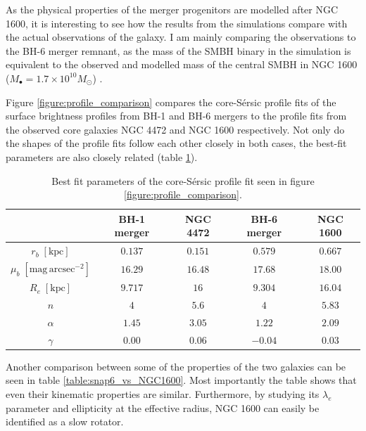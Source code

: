 \documentclass[english, oneside]{HYgradu}
\begin{document}
As the physical properties of the merger progenitors are modelled after NGC 1600, it is interesting to see how the results from the simulations compare with the actual observations of the galaxy. I am mainly comparing the observations to the BH-6 merger remnant, as the mass of the SMBH binary in the simulation is equivalent to the observed and modelled mass of the central SMBH in NGC 1600 ($M_\bullet = 1.7 \times 10^{10} M_\odot$) \citep{Thomas2016}.

Figure \ref{figure:profile_comparison} compares the core-Sérsic profile fits of the surface brightness profiles from BH-1 and BH-6 mergers to the profile fits from the observed core galaxies NGC 4472 and NGC 1600 respectively. Not only do the shapes of the profile fits follow each other closely in both cases, the best-fit parameters are also closely related (table \ref{table:bestfit_parameter_comparison}). 

\begin{table}
	\begin{center}
		\scriptsize
		\begin{tabular}{| c | c c | c c |}
		\hline
		 & BH-1 merger & NGC 4472 & BH-6 merger & NGC 1600 \\
		\hline
		$r_b \; \mathrm{[kpc]}$ & $0.137$ & $0.151$ & $0.579$ & $0.667$ \\
		$\mu_b \; \mathrm{[mag \, arcsec^{-2}]}$ & $16.29$ & $16.48$ & $17.68$ & $18.00$ \\
		$R_e \; \mathrm{[kpc]}$ & $9.717$ & $16$ & $9.304$ & $16.04$ \\
		$n$ & $4$ & $5.6$ & $4$ & $5.83$ \\
		$\alpha$ & $1.45$ & $3.05$ & $1.22$ & $2.09$ \\
		$\gamma$ & $0.00$ & $0.06$ & $-0.04$ & $0.03$ \\
		\hline
		\end{tabular}
	\end{center}
	\caption{Best fit parameters of the core-Sérsic profile fit seen in figure \ref{figure:profile_comparison}.}
	\label{table:bestfit_parameter_comparison}
\end{table}

Another comparison between some of the properties of the two galaxies can be seen in table \ref{table:snap6_vs_NGC1600}. Most importantly the table shows that even their kinematic properties are similar. Furthermore, by studying its $\lambda_e$ parameter and ellipticity at the effective radius, NGC 1600 can easily be identified as a slow rotator. 
\end{document}
